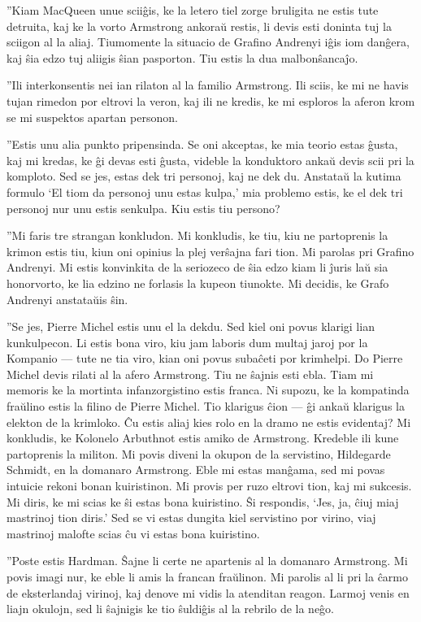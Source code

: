 ''Kiam MacQueen unue sciiĝis, ke la letero tiel zorge bruligita ne estis tute detruita, kaj ke la vorto Armstrong ankoraŭ restis, li devis esti doninta tuj la sciigon al la aliaj. Tiumomente la situacio de Grafino Andrenyi iĝis iom danĝera, kaj ŝia edzo tuj aliigis ŝian pasporton. Tiu estis la dua malbonŝancaĵo.

''Ili interkonsentis nei ian rilaton al la familio Armstrong. Ili sciis, ke mi ne havis tujan rimedon por eltrovi la veron, kaj ili ne kredis, ke mi esploros la aferon krom se mi suspektos apartan personon.

''Estis unu alia punkto pripensinda. Se oni akceptas, ke mia teorio estas ĝusta, kaj mi kredas, ke ĝi devas esti ĝusta, videble la konduktoro ankaŭ devis scii pri la komploto. Sed se jes, estas dek tri personoj, kaj ne dek du. Anstataŭ la kutima formulo `El tiom da personoj unu estas kulpa,' mia problemo estis, ke el dek tri personoj nur unu estis senkulpa. Kiu estis tiu persono?

''Mi faris tre strangan konkludon. Mi konkludis, ke tiu, kiu ne partoprenis la krimon estis tiu, kiun oni opinius la plej verŝajna fari tion. Mi parolas pri Grafino Andrenyi. Mi estis konvinkita de la seriozeco de ŝia edzo kiam li ĵuris laŭ sia honorvorto, ke lia edzino ne forlasis la kupeon tiunokte. Mi decidis, ke Grafo Andrenyi anstataŭis ŝin.

''Se jes, Pierre Michel estis unu el la dekdu. Sed kiel oni povus klarigi lian kunkulpecon. Li estis bona viro, kiu jam laboris dum multaj jaroj por la Kompanio --- tute ne tia viro, kian oni povus subaĉeti por krimhelpi. Do Pierre Michel devis rilati al la afero Armstrong. Tiu ne ŝajnis esti ebla. Tiam mi memoris ke la mortinta infanzorgistino estis franca. Ni supozu, ke la kompatinda fraŭlino estis la filino de Pierre Michel. Tio klarigus ĉion --- ĝi ankaŭ klarigus la elekton de la krimloko. Ĉu estis aliaj kies rolo en la dramo ne estis evidentaj? Mi konkludis, ke Kolonelo Arbuthnot estis amiko de Armstrong. Kredeble ili kune partoprenis la militon. Mi povis diveni la okupon de la servistino, Hildegarde Schmidt, en la domanaro Armstrong. Eble mi estas manĝama, sed mi povas intuicie rekoni bonan kuiristinon. Mi provis per ruzo eltrovi tion, kaj mi sukcesis. Mi diris, ke mi scias ke ŝi estas bona kuiristino. Ŝi respondis, `Jes, ja, ĉiuj miaj mastrinoj tion diris.' Sed se vi estas dungita kiel servistino por virino, viaj mastrinoj malofte scias ĉu vi estas bona kuiristino.

''Poste estis Hardman. Ŝajne li certe ne apartenis al la domanaro Armstrong. Mi povis imagi nur, ke eble li amis la francan fraŭlinon. Mi parolis al li pri la ĉarmo de eksterlandaj virinoj, kaj denove mi vidis la atenditan reagon. Larmoj venis en liajn okulojn, sed li ŝajnigis ke tio ŝuldiĝis al la rebrilo de la neĝo.

